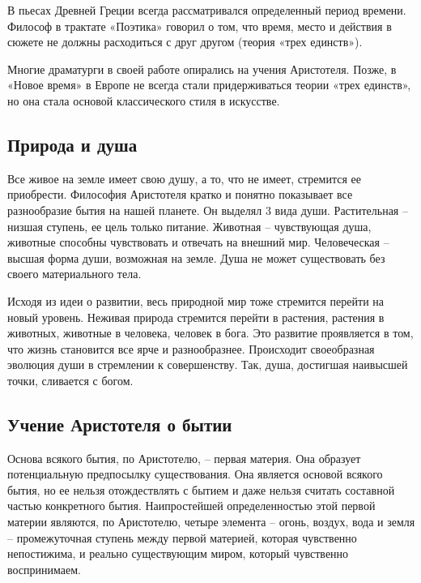 \documentclass[
]{article}
\begin{document}
В пьесах Древней Греции всегда рассматривался определенный период
времени. Философ в трактате «Поэтика» говорил о том, что время, место и
действия в сюжете не должны расходиться с друг другом (теория «трех
единств»).

Многие драматурги в своей работе опирались на учения Аристотеля. Позже,
в «Новое время» в Европе не всегда стали придерживаться теории «трех
единств», но она стала основой классического стиля в искусстве.

\hypertarget{ux43fux440ux438ux440ux43eux434ux430-ux438-ux434ux443ux448ux430}{%
\subsection{Природа и
душа}\label{ux43fux440ux438ux440ux43eux434ux430-ux438-ux434ux443ux448ux430}}

Все живое на земле имеет свою душу, а то, что не имеет, стремится ее
приобрести. Философия Аристотеля кратко и понятно показывает все
разнообразие бытия на нашей планете. Он выделял 3 вида души.
Растительная -- низшая ступень, ее цель только питание. Животная --
чувствующая душа, животные способны чувствовать и отвечать на внешний
мир. Человеческая -- высшая форма души, возможная на земле. Душа не
может существовать без своего материального тела.

Исходя из идеи о развитии, весь природной мир тоже стремится перейти на
новый уровень. Неживая природа стремится перейти в растения, растения в
животных, животные в человека, человек в бога. Это развитие проявляется
в том, что жизнь становится все ярче и разнообразнее. Происходит
своеобразная эволюция души в стремлении к совершенству. Так, душа,
достигшая наивысшей точки, сливается с богом.

\hypertarget{ux443ux447ux435ux43dux438ux435-ux430ux440ux438ux441ux442ux43eux442ux435ux43bux44f-ux43e-ux431ux44bux442ux438ux438}{%
\subsection{Учение Аристотеля о
бытии}\label{ux443ux447ux435ux43dux438ux435-ux430ux440ux438ux441ux442ux43eux442ux435ux43bux44f-ux43e-ux431ux44bux442ux438ux438}}

Основа всякого бытия, по Аристотелю, -- первая материя. Она образует
потенциальную предпосылку существования. Она является основой всякого
бытия, но ее нельзя отождествлять с бытием и даже нельзя считать
составной частью конкретного бытия. Наипростейшей определенностью этой
первой материи являются, по Аристотелю, четыре элемента -- огонь,
воздух, вода и земля -- промежуточная ступень между первой материей,
которая чувственно непостижима, и реально существующим миром, который
чувственно воспринимаем.
\end{document}
